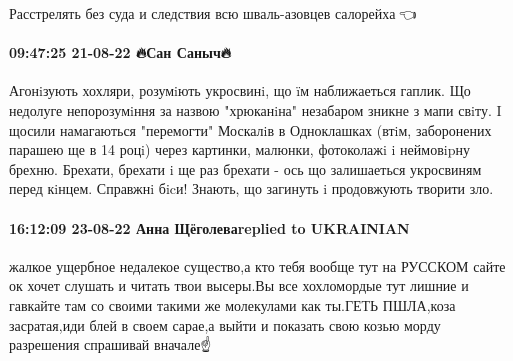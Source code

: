 Расстрелять без суда и следствия всю шваль-азовцев салорейха🤪👈

\paragraph{09:47:25 21-08-22 🔥Сан Саныч🔥}

Агонiзують хохляри, розумiють укросвинi, що ïм наближаеться гаплик. Що недолуге непорозумiння за назвою "хрюканiна" незабаром зникне з мапи свiту. I щосили намагаються "перемогти" Москалiв в Одноклашках (втiм, заборонених парашею ще в 14 роцi) через картинки, малюнки, фотоколажi i неймовipну брехню.
Брехати, брехати i ще раз брехати - ось що залишаеться укросвиням перед кiнцем.
Справжнi бicи! Знають, що загинуть i продовжують творити зло.

\paragraph{16:12:09 23-08-22 Анна Щёголеваreplied to UKRAINIAN}

жалкое ущербное недалекое существо,а кто тебя вообще тут на РУССКОМ сайте ок
хочет слушать и читать твои высеры.Вы все хохломордые тут лишние и гавкайте там
со своими такими же молекулами как ты.ГЕТЬ ПШЛА,коза засратая,иди блей в своем
сарае,а выйти и показать свою козью морду разрешения спрашивай вначале☝


